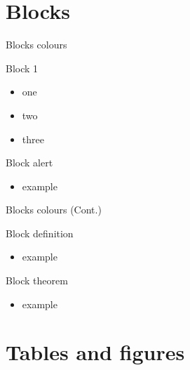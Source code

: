 \documentclass[14pt,xcolor=svgnames]{beamer} %
\begin{document}
\section{Blocks}
	\begin{frame}{Blocks colours}
		
		\begin{block}{Block 1}
			\begin{itemize}
			\item one
			\item two
			\item three
			\end{itemize}
		\end{block}
		

		\begin{alertblock}{Block alert}
			\begin{itemize}
				\item example
			\end{itemize}
		\end{alertblock}
	\end{frame}


\begin{frame}{Blocks colours (Cont.)}
	

	
	\begin{definition}{Block definition}
		\begin{itemize}
			\item example
		\end{itemize}
	\end{definition}
	
	\begin{theorem}{Block theorem}
		\begin{itemize}
			\item example
		\end{itemize}
	\end{theorem}
\end{frame}

\section{Tables and figures}
	
\end{document}
